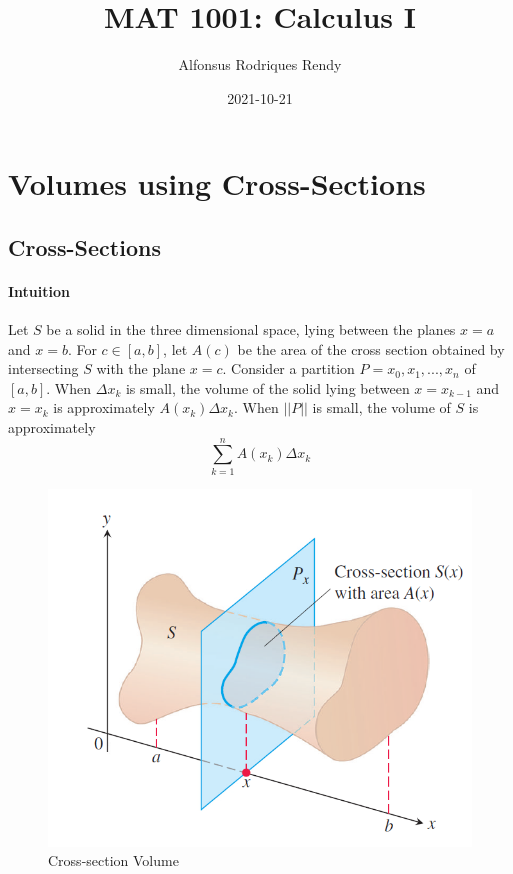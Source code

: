 \documentclass[12pt]{article}
\title{MAT 1001: Calculus I}
\author{Alfonsus Rodriques Rendy}
\date{2021-10-21}
\begin{document}
\begin{center}
    \hspace*{-0.5cm}
\end{center}

\section{Volumes using Cross-Sections}
\subsection{Cross-Sections}
\paragraph{Intuition}
Let $S$ be a solid in the three dimensional space, lying between the planes $x = a$ and $x = b$.
For $c \in [a, b]$, let $A(c)$ be the area of the cross section obtained by intersecting $S$ with the plane $x = c$.
Consider a partition $P = {x_0, x_1, ..., x_n}$ of $[a,b]$. When $\Delta x_k$ is small, the volume of the solid lying between
$x = x_{k-1}$ and $x = x_k$ is approximately $A(x_k) \Delta x_k$. When $||P||$ is small, the volume of $S$ is approximately
\[
    \sum_{k = 1}^n A(x_k) \Delta x_k
\]
\begin{figure}[H]
     \centering
     \includegraphics[width = 0.3\linewidth]{Images/cross-section.png}
     \caption{Cross-section Volume}
\end{figure}
\end{document}
